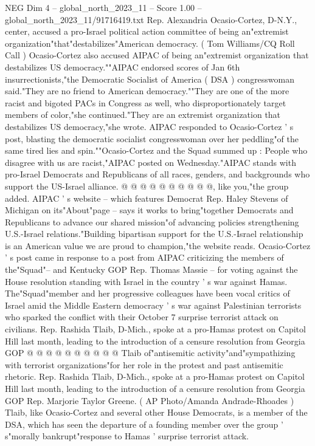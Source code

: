 \begin{textsample}{NEG Dim 4 – global\_north\_2023\_11 – Score 1.00 – global\_north\_2023\_11/91716419.txt}  \label{ex:f4_neg_181}
Rep.
Alexandria Ocasio-Cortez, D-N.Y., center, accused a pro-Israel political action committee of being an"extremist organization"that"destabilizes"American democracy. ( Tom Williams/CQ Roll Call ) Ocasio-Cortez also accused AIPAC of being an"extremist organization that destabilizes US democracy.""AIPAC endorsed scores of Jan 6th insurrectionists,"the Democratic Socialist of America ( DSA ) congresswoman said."They are no friend to American democracy.""They are one of the more racist and bigoted PACs in Congress as well, who disproportionately target members of color,"she continued."They are an extremist organization that destabilizes US democracy,"she wrote.
AIPAC responded to Ocasio-Cortez ' s post, blasting the democratic socialist congresswoman over her peddling"of the same tired lies and spin.""Ocasio-Cortez and the Squad summed up : People who disagree with us are racist,"AIPAC posted on Wednesday."AIPAC stands with pro-Israel Democrats and Republicans of all races, genders, and backgrounds who support the US-Israel alliance. @ @ @ @ @ @ @ @ @ @, like you,"the group added.
AIPAC ' s website -- which features Democrat Rep.
Haley Stevens of Michigan on its"About"page -- says it works to bring"together Democrats and Republicans to advance our shared mission"of advancing policies strengthening U.S.-Israel relations."Building bipartisan support for the U.S.-Israel relationship is an American value we are proud to champion,"the website reads.
Ocasio-Cortez ' s post came in response to a post from AIPAC criticizing the members of the"Squad"-- and Kentucky GOP Rep.
Thomas Massie -- for voting against the House resolution standing with Israel in the country ' s war against Hamas.
The"Squad"member and her progressive colleagues have been vocal critics of Israel amid the Middle Eastern democracy ' s war against Palestinian terrorists who sparked the conflict with their October 7 surprise terrorist attack on civilians.
Rep.
Rashida Tlaib, D-Mich., spoke at a pro-Hamas protest on Capitol Hill last month, leading to the introduction of a censure resolution from Georgia GOP @ @ @ @ @ @ @ @ @ @ Tlaib of"antisemitic activity"and"sympathizing with terrorist organizations"for her role in the protest and past antisemitic rhetoric.
Rep.
Rashida Tlaib, D-Mich., spoke at a pro-Hamas protest on Capitol Hill last month, leading to the introduction of a censure resolution from Georgia GOP Rep.
Marjorie Taylor Greene. ( AP Photo/Amanda Andrade-Rhoades ) Tlaib, like Ocasio-Cortez and several other House Democrats, is a member of the DSA, which has seen the departure of a founding member over the group ' s"morally bankrupt"response to Hamas ' surprise terrorist attack.

\end{textsample}
